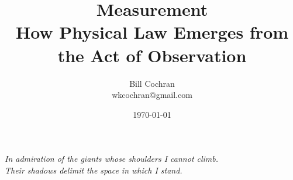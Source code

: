 \documentclass[12pt,oneside]{book}
\begin{document}
\title{Measurement\\
\large How Physical Law Emerges from the Act of Observation}

\author{Bill Cochran\\wkcochran@gmail.com}
\date{\today}

\maketitle

\begin{center}
\vspace*{2em}
\textit{In admiration of the giants whose shoulders I cannot climb. \\
Their shadows delimit the space in which I stand.}
\vspace*{6em}
\end{center}

\newpage
\frontmatter
\onehalfspacing


\tableofcontents


\mainmatter











\cleardoublepage

\backmatter

\nocite{parkinson1996}


\end{document}
